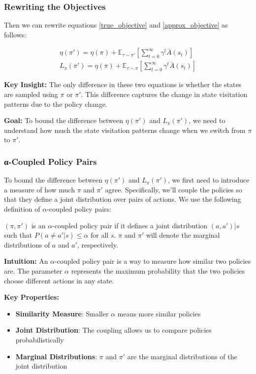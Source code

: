 \subsubsection{Rewriting the Objectives}

Then we can rewrite equations \ref{true_objective} and \ref{approx_objective} as follows:

\begin{align}
    \eta(\pi') = \eta(\pi) + \mathbb{E}_{\tau \sim \pi'}[\sum_{t = 0}^{\infty}\gamma^t \bar{A}(s_t)] \\
    L_{\pi}(\pi') = \eta(\pi) + \mathbb{E}_{\tau \sim \pi}[\sum_{t = 0}^{\infty}\gamma^t \bar{A}(s_t)] 
\end{align}

\textbf{Key Insight:}
The only difference in these two equations is whether the states are sampled using $\pi$ or $\pi'$. This difference captures the change in state visitation patterns due to the policy change.

\textbf{Goal:}
To bound the difference between $\eta(\pi')$ and $L_{\pi}(\pi')$, we need to understand how much the state visitation patterns change when we switch from $\pi$ to $\pi'$.

\subsubsection{α-Coupled Policy Pairs}

To bound the difference between $\eta(\pi')$ and $L_{\pi}(\pi')$, we first need to introduce a measure of how much $\pi$ and $\pi'$ agree. Specifically, we'll couple the policies so that they define a joint distribution over pairs of actions. We use the following definition of $\alpha$-coupled policy pairs:

\begin{definition}
    $(\pi, \pi')$ is an $\alpha$-coupled policy pair if it defines a joint distribution $(a, a')|s$ such that $P(a \neq a'|s) \le \alpha$ for all $s$. $\pi$ and $\pi'$ will denote the marginal distributions of $a$ and $a'$, respectively.
\end{definition}

\textbf{Intuition:}
An $\alpha$-coupled policy pair is a way to measure how similar two policies are. The parameter $\alpha$ represents the maximum probability that the two policies choose different actions in any state.

\textbf{Key Properties:}
\begin{itemize}
    \item \textbf{Similarity Measure}: Smaller $\alpha$ means more similar policies
    \item \textbf{Joint Distribution}: The coupling allows us to compare policies probabilistically
    \item \textbf{Marginal Distributions}: $\pi$ and $\pi'$ are the marginal distributions of the joint distribution
\end{itemize}

